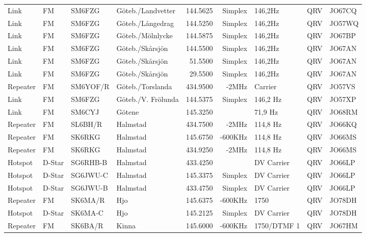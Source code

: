 \begin{longtable}{llllrrlcl}
Link     & FM     & SM6FZG   & Göteb./Landvetter   & 144.5625  & Simplex & 146,2Hz         & QRV  & JO67CQ \\
Link     & FM     & SM6FZG   & Göteb./Långedrag    & 144.5250  & Simplex & 146,2Hz         & QRV  & JO57WQ \\
Link     & FM     & SM6FZG   & Göteb./Mölnlycke    & 144.5875  & Simplex & 146,2Hz         & QRV  & JO67BP \\
Link     & FM     & SM6FZG   & Göteb./Skårsjön     & 144.5500  & Simplex & 146,2Hz         & QRV  & JO67AN \\
Link     & FM     & SM6FZG   & Göteb./Skårsjön     & 51.5500   & Simplex & 146,2Hz         & QRV  & JO67AN \\
Link     & FM     & SM6FZG   & Göteb./Skårsjön     & 29.5500   & Simplex & 146,2Hz         & QRV  & JO67AN \\
Repeater & FM     & SM6YOF/R & Göteb./Torslanda    & 434.9500  & -2MHz   & Carrier         & QRV  & JO57VS \\
Link     & FM     & SM6FZG   & Göteb./V. Frölunda  & 144.5375  & Simplex & 146,2 Hz        & QRV  & JO57XP \\
Link     & FM     & SM6CYJ   & Götene              & 145.3250  &         & 71,9 Hz         & QRV  & JO68RM \\
Repeater & FM     & SL6BH/R  & Halmstad            & 434.7500  & -2MHz   & 114,8 Hz        & QRV  & JO66KQ \\
Repeater & FM     & SK6RKG   & Halmstad            & 145.6750  & -600KHz & 114,8 Hz        & QRV  & JO66MS \\
Repeater & FM     & SK6RKG   & Halmstad            & 434.9250  & -2MHz   & 114,8 Hz        & QRV  & JO66MS \\
Hotspot  & D-Star & SG6RHB-B & Halmstad            & 433.4250  &         & DV Carrier      & QRV  & JO66LP \\
Hotspot  & D-Star & SG6JWU-C & Halmstad            & 145.3375  & Simplex & DV Carrier      & QRV  & JO66LP \\
Hotspot  & D-Star & SG6JWU-B & Halmstad            & 433.4750  & Simplex & DV Carrier      & QRV  & JO66LP \\
Repeater & FM     & SK6MA/R  & Hjo                 & 145.6375  & -600KHz & 1750            & QRV  & JO78DH \\
Hotspot  & D-Star & SK6MA-C  & Hjo                 & 145.2125  & Simplex & DV Carrier      & QRV  & JO78DH \\
Repeater & FM     & SK6BA/R  & Kinna               & 145.6000  & -600KHz & 1750/DTMF 1     & QRV  & JO67HM \\

\end{longtable}
